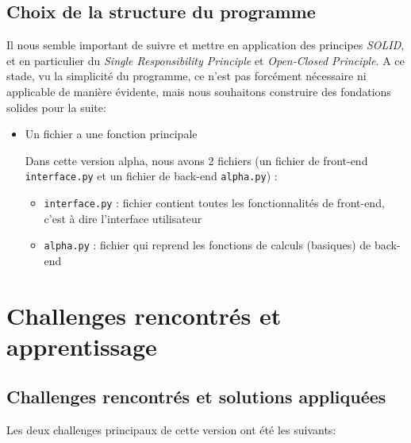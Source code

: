 \subsection{Choix de la structure du programme}

Il nous semble important de suivre et mettre en application des principes \emph{SOLID}, et en particulier du
\emph{Single Responsibility Principle} et \emph{Open-Closed Principle}.
A ce stade, vu la simplicité du programme, ce n’est pas forcément nécessaire ni applicable de manière évidente,
mais nous souhaitons construire des fondations solides pour la suite:
\begin{itemize}
    \item Un fichier a une fonction principale

          Dans cette version alpha, nous avons 2 fichiers (un fichier de front-end \texttt{interface.py} et
          un fichier de back-end \texttt{alpha.py}) :
          \begin{itemize}
              \item \texttt{interface.py} : fichier contient toutes les fonctionnalités de front-end, c’est à dire
                    l’interface utilisateur
              \item \texttt{alpha.py} : fichier qui reprend les fonctions de calculs (basiques) de back-end
          \end{itemize}

\end{itemize}


\section{Challenges rencontrés et apprentissage}

\subsection{Challenges rencontrés et solutions appliquées}

Les deux challenges principaux de cette version ont été les suivants:

